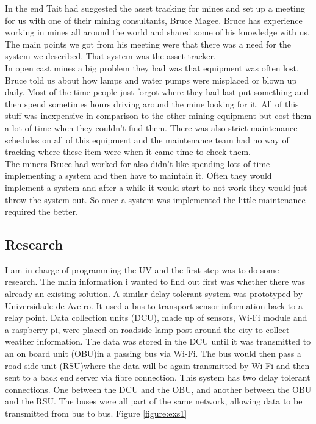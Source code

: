 \documentclass[a4paper,12pt]{article}
\begin{document}
In the end Tait had suggested the asset tracking for mines and set up a meeting  for us with one of their mining consultants, Bruce Magee. Bruce has experience working in mines all around the world and shared some of his knowledge with us. The main points we got from his meeting were that there was a need for the system we described. That system was the asset tracker.\\

In open cast mines a big problem they had was that equipment was often lost. Bruce told us about how lamps and water pumps were misplaced or blown up daily. Most of the time people just forgot where they had last put something and then spend sometimes hours driving around the mine looking for it. All of this stuff was inexpensive in comparison to the other mining equipment but cost them a lot of time when they couldn't find them. There was also strict maintenance schedules on all of this equipment and the maintenance team had no way of tracking where these item were when it came time to check them.\\

The miners Bruce had worked for also didn't like spending lots of time implementing a system and then have to maintain it. Often they would implement a system and after a while it would start to not work they would just throw the system out. So once a system was implemented the little maintenance required the better.\\

\clearpage
\begin{flushleft}
\subsection{Research}
\end{flushleft}

I am in charge of programming the UV and the first step was to do some research. The main information i wanted to find out first was whether there was already an existing solution. A similar delay tolerant system was prototyped by Universidade de Aveiro. It used a bus to transport sensor information back to a relay point. Data collection units (DCU), made up of sensors, Wi-Fi module and a raspberry pi, were placed on roadside lamp post around the city to collect weather information. The data was stored in the DCU until it was transmitted to an on board unit (OBU)in a passing bus via Wi-Fi. The bus would then pass a road side unit (RSU)where the data will be again transmitted by Wi-Fi and then sent to a back end server via fibre connection. This system has two delay tolerant connections. One between the DCU and  the OBU, and another between the OBU and the RSU. The buses were all  part  of the same network, allowing data to be transmitted from bus to bus. Figure \ref{figure:exs1}
\end{document}
